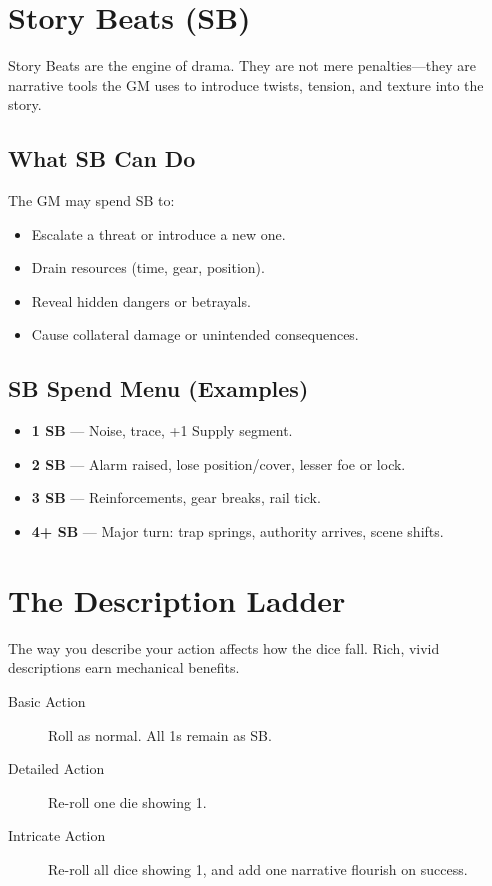 \section{Story Beats (SB)}

Story Beats are the engine of drama. They are not mere penalties—they are narrative tools the GM uses to introduce twists, tension, and texture into the story.

\subsection*{What SB Can Do}

The GM may spend SB to:
\begin{itemize}
  \item Escalate a threat or introduce a new one.
  \item Drain resources (time, gear, position).
  \item Reveal hidden dangers or betrayals.
  \item Cause collateral damage or unintended consequences.
\end{itemize}

\subsection*{SB Spend Menu (Examples)}

\begin{itemize}
  \item \textbf{1 SB} — Noise, trace, +1 Supply segment.
  \item \textbf{2 SB} — Alarm raised, lose position/cover, lesser foe or lock.
  \item \textbf{3 SB} — Reinforcements, gear breaks, rail tick.
  \item \textbf{4+ SB} — Major turn: trap springs, authority arrives, scene shifts.
\end{itemize}

\section{The Description Ladder}

The way you describe your action affects how the dice fall. Rich, vivid descriptions earn mechanical benefits.

\begin{description}
  \item[Basic Action]  Roll as normal. All 1s remain as SB.
  \item[Detailed Action]  Re-roll one die showing 1.
  \item[Intricate Action]  Re-roll all dice showing 1, and add one narrative flourish on success.
\end{description}

